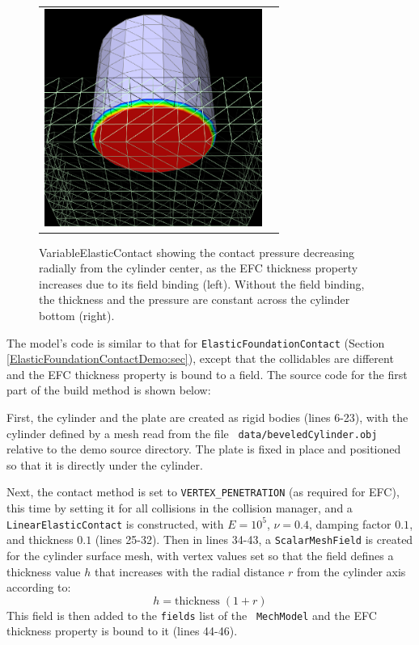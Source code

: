 \begin{figure}[ht]
\begin{center}
\begin{tabular}{cc}
 \includegraphics[width=2.8in]{images/VariableElasticContactNF}
\fi
\end{tabular}
\end{center}
\caption {VariableElasticContact showing the contact pressure decreasing
radially from the cylinder center, as the EFC {\sf thickness} property
increases due to its field binding (left). Without the field
binding, the thickness and the pressure are constant across
the cylinder bottom (right).}
\label{VariableElasticContact:fig}
\end{figure}

The model's code is similar to that for {\tt ElasticFoundationContact}
(Section \ref{ElasticFoundationContactDemo:sec}), except that the
collidables are different and the EFC {\sf thickness} property
is bound to a field. The source code for the first part of the build
method is shown below:

\lstset{numbers=left} 
\iflatexml

\else

\fi
\lstset{numbers=none}

First, the cylinder and the plate are created as rigid bodies (lines
6-23), with the cylinder defined by a mesh read from the file {\tt
data/beveledCylinder.obj} relative to the demo source directory.  The
plate is fixed in place and positioned so that it is directly under
the cylinder.

Next, the contact method is set to {\tt VERTEX\_PENETRATION} (as
required for EFC), this time by setting it for all collisions in the
collision manager, and a {\tt LinearElasticContact} is constructed,
with $E = 10^5$, $\nu=0.4$, damping factor $0.1$, and thickness $0.1$
(lines 25-32). Then in lines 34-43, a {\tt ScalarMeshField} is created
for the cylinder surface mesh, with vertex values set so that the
field defines a thickness value $h$ that increases with the radial
distance $r$ from the cylinder axis according to:
%
\begin{equation*}
h = \text{thickness}\; (1+r)
\end{equation*}
%
This field is then added to the {\tt fields} list of the {\tt
MechModel} and the EFC {\sf thickness} property is bound to it
(lines 44-46).

